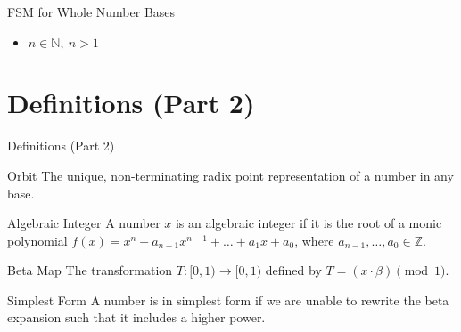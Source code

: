 \documentclass{beamer}
\begin{document}
          \begin{frame}{FSM for Whole Number Bases}
            \begin{center}
            \end{center}
            \begin{itemize}
              \item $n\in\mathbb{N},\ n>1$
            \end{itemize}
          \end{frame}

















          \section{Definitions (Part 2)}
          \begin{frame}{Definitions (Part 2)}
            \begin{block}{Orbit}
              The unique, non-terminating radix point representation of a number in any base.
            \end{block}

            \begin{block}{Algebraic Integer}
              A number $x$ is an algebraic integer if it is the root of a monic polynomial $f(x) = x^n + a_{n-1}x^{n-1}+\dots+a_1x+a_0$, where $a_{n-1},\dots,a_0\in\mathbb{Z}$.
            \end{block}

            \begin{block}{Beta Map}
              The transformation $T:[0,1)\to[0,1)$ defined by $T=(x\cdot\beta)\pmod{1}$.
            \end{block}

            \begin{block}{Simplest Form}
              A number is in simplest form if we are unable to rewrite the beta expansion such that it includes a higher power.
            \end{block}
          \end{frame}
\end{document}
